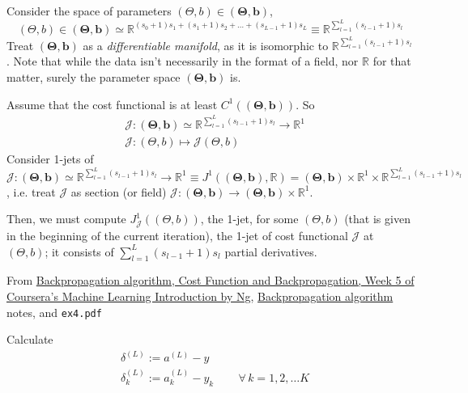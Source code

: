 \documentclass[10pt]{amsart}
\begin{document}
\begin{multicols*}{2}
Consider the space of parameters $(\Theta,b) \in (\mathbf{\Theta}, \mathbf{b})$, 
\begin{equation}
(\Theta,b) \in (\mathbf{\Theta}, \mathbf{b}) \simeq \mathbb{R}^{ (s_0 + 1)s_1 + (s_1 +1)s_2 + \dots + (s_{L-1} + 1)s_L } \equiv \mathbb{R}^{ \sum_{l=1}^L (s_{l-1} + 1) s_l }
\end{equation}
Treat $(\mathbf{\Theta}, \mathbf{b})$ as a \emph{differentiable manifold}, as it is isomorphic to $\mathbb{R}^{ \sum_{l=1}^L (s_{l-1} + 1) s_l }$.  Note that while the data isn't necessarily in the format of a field, nor $\mathbb{R}$ for that matter, surely the parameter space $(\mathbf{\Theta},\mathbf{b})$ is.  

Assume that the cost functional is at least $C^1( (\mathbf{\Theta},\mathbf{b}) )$.  So 
\[
\begin{aligned}
&	\mathcal{J} : (\mathbf{\Theta},\mathbf{b}) \simeq \mathbb{R}^{ \sum_{l=1}^L (s_{l-1} + 1) s_l  } \to \mathbb{R}^1 \\ 
& 	\mathcal{J} : (\Theta,b) \mapsto \mathcal{J}( \Theta,b)
\end{aligned}
\]
Consider 1-jets of $\mathcal{J} : (\mathbf{\Theta},\mathbf{b}) \simeq \mathbb{R}^{ \sum_{l=1}^L  (s_{l-1} + 1)s_l } \to \mathbb{R}^1 \equiv J^1( (\mathbf{\Theta},\mathbf{b}) , \mathbb{R}) = (\mathbf{\Theta},\mathbf{b}) \times \mathbb{R}^1 \times \mathbb{R}^{ \sum_{l=1}^L (s_{l-1} + 1) s_l }$, i.e. treat $\mathcal{J}$ as section (or field)  $\mathcal{J} :  (\mathbf{\Theta},\mathbf{b}) \to (\mathbf{\Theta},\mathbf{b}) \times \mathbb{R}^1$.  

Then, we must compute $J^1_{\mathcal{J}}( (\Theta,b))$, the 1-jet, for some $(\Theta,b)$ (that is given in the beginning of the current iteration), the 1-jet of cost functional $\mathcal{J}$ at $(\Theta,b)$; it consists of $\sum_{l=1}^L (s_{l-1} + 1)s_l$ partial derivatives.  




From \href{https://www.coursera.org/learn/machine-learning/lecture/1z9WW/backpropagation-algorithm}{Backpropagation algorithm, Cost Function and Backpropagation, Week 5 of Coursera's Machine Learning Introduction by Ng}, \href{https://www.coursera.org/learn/machine-learning/supplement/pjdBA/backpropagation-algorithm}{Backpropagation algorithm} notes, and \verb|ex4.pdf|

Calculate
\begin{equation}
\begin{aligned}
  & \delta^{(L)} := a^{(L)} - y \\ 
  & \delta^{(L)}_k := a_k^{(L)} - y_k \qquad \, \forall \, k = 1,2, \dots K
  \end{aligned}
\end{equation}


\end{multicols*}
\end{document}
